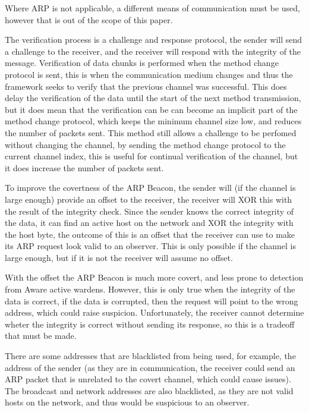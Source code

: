 Where ARP is not applicable, a different means of communication must be used, however that is out of the scope of this paper.

The verification process is a challenge and response protocol, the sender will send a challenge to the receiver, and the receiver will respond with the integrity of the message. Verification of data chunks is performed when the method change protocol is sent, this is when the communication medium changes and thus the framework seeks to verify that the previous channel was successful. This does delay the verification of the data until the start of the next method transmission, but it does mean that the verification can be can become an implicit part of the method change protocol, which keeps the minimum channel size low, and reduces the number of packets sent. This method still allows a 
challenge to be perfomed without changing the channel, by sending the method change protocol to the current channel index, this is useful for continual verification of the channel, but it does increase the number of packets sent.

To improve the covertness of the ARP Beacon, the sender will (if the channel is large enough) provide an offset to the receiver, the receiver will XOR this with the result of the integrity check. Since the sender knows the correct integrity of the data, it can find an active host on the network and XOR the integrity with the host byte, the outcome of this is an offset that the receiver can use to make its ARP request look valid to an observer. This is only possible if the channel is large enough, but if it is not the receiver will assume no offset.

With the offset the ARP Beacon is much more covert, and less prone to detection from Aware active wardens. However, this is only true when the integrity of the data is correct, if the data is corrupted, then the request will point to the wrong address, which could raise suspicion. Unfortunately, the receiver cannot determine wheter the integrity is correct without sending its response, so this is a tradeoff that must be made.

There are some addresses that are blacklisted from being used, for example, the address of the sender (as they are in communication, the receiver could send an ARP packet that is unrelated to the covert channel, which could cause issues). The broadcast and network addresses are also blacklisted, as they are not valid hosts on the network, and thus would be suspicious to an observer. 

